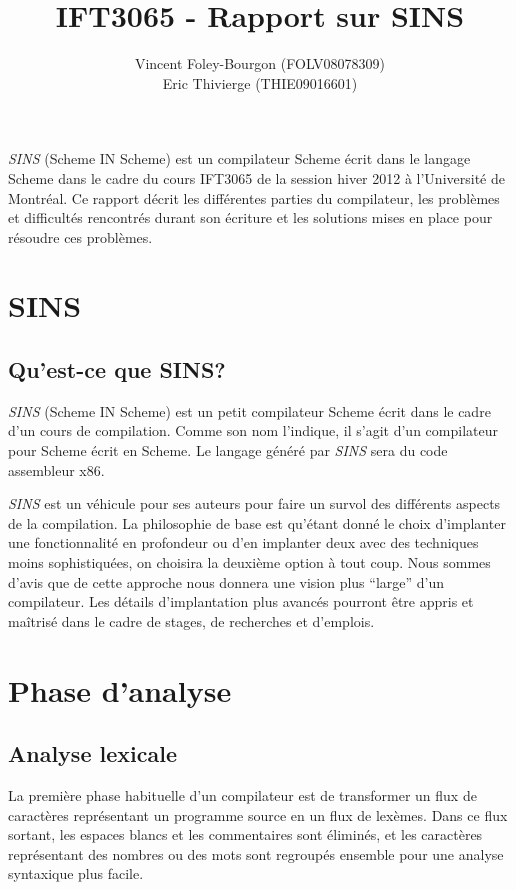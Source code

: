 \documentclass[11pt]{report}
\begin{document}
\title{IFT3065 - Rapport sur SINS}
\author{Vincent Foley-Bourgon (FOLV08078309) \\
Eric Thivierge (THIE09016601)}
\maketitle

\abstract

\emph{SINS} (Scheme IN Scheme) est un compilateur Scheme écrit dans le
langage Scheme dans le cadre du cours IFT3065 de la session hiver 2012
à l'Université de Montréal.  Ce rapport décrit les différentes parties
du compilateur, les problèmes et difficultés rencontrés durant son
écriture et les solutions mises en place pour résoudre ces problèmes.

\chapter{SINS}

\section{Qu'est-ce que SINS?}

\emph{SINS} (Scheme IN Scheme) est un petit compilateur Scheme écrit
dans le cadre d'un cours de compilation.  Comme son nom l'indique, il
s'agit d'un compilateur pour Scheme écrit en Scheme.  Le langage généré
par \emph{SINS} sera du code assembleur x86.

\emph{SINS} est un véhicule pour ses auteurs pour faire un survol des
différents aspects de la compilation.  La philosophie de base est
qu'étant donné le choix d'implanter une fonctionnalité en profondeur
ou d'en implanter deux avec des techniques moins sophistiquées, on
choisira la deuxième option à tout coup.  Nous sommes d'avis que de
cette approche nous donnera une vision plus ``large'' d'un
compilateur.  Les détails d'implantation plus avancés pourront être
appris et maîtrisé dans le cadre de stages, de recherches et
d'emplois.

\chapter{Phase d'analyse}

\section{Analyse lexicale}

La première phase habituelle d'un compilateur est de transformer un
flux de caractères représentant un programme source en un flux de
lexèmes.  Dans ce flux sortant, les espaces blancs et les commentaires
sont éliminés, et les caractères représentant des nombres ou des mots
sont regroupés ensemble pour une analyse syntaxique plus facile.
\end{document}
